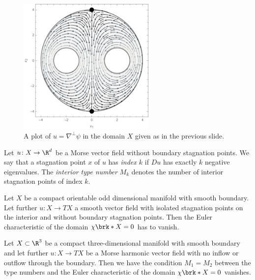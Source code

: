 \begin{frame}
  \begin{figure}
    \centering
    \includegraphics[width=0.6\textwidth]{../Plots/n2_hvf_roundRegion_InflowOutflow_gray_2.pdf}
    \caption{A plot of $u=\nabla^\perp\psi$ in the domain $X$ given as in the previous slide.}
    \label{pl:n2_hvf_noInflowNoOutflow}
  \end{figure}
\end{frame}

\begin{frame}
  \begin{definition}
    Let $u\colon X\to\R^d$ be a Morse vector field without boundary stagnation points.
    We say that a stagnation point $x$ of $u$ has \emph{index $k$} if $Du$ has exactly $k$ negative eigenvalues.
    The \emph{interior type number} $M_k$ denotes the number of interior stagnation points of index $k$.
  \end{definition}
\end{frame}

\begin{frame}
  \begin{proposition}\label{pr:n3_domainCond}
    Let $X$ be a compact orientable odd dimensional manifold with smooth boundary.
    Let further $u\colon X\to TX$ a smooth vector field with isolated stagnation points on the interior and without
    boundary stagnation points. Then the Euler characteristic of the domain $\chi\brk*{X}=0$ has to vanish.
  \end{proposition} 
\end{frame}

\begin{frame}
  \begin{corollary}\label{co:n3_conditionTypeNbrII}
    Let $X\subset\R^3$ be a compact three-dimensional manifold with smooth boundary and let further
    $u\colon X\to TX$ be a Morse harmonic vector field with no
    inflow or outflow through the boundary. Then
    we have the condition $M_1=M_2$ between the type numbers and the Euler characteristic of the domain $\chi\brk*{X}=0$ vanishes.
  \end{corollary}
\end{frame}



